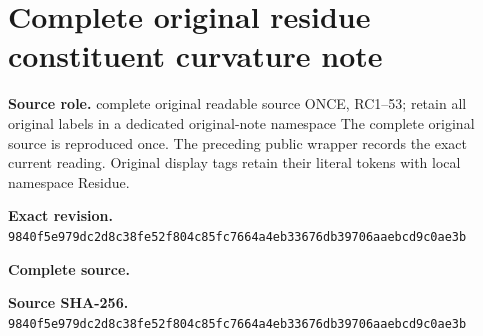 \begingroup
\sloppy
\small
\makeatletter
\let\EndpointOriginalTagForm\tagform@
\def\tagform@#1{\EndpointOriginalTagForm{Residue\, #1}}
\makeatother
\section{Complete original residue constituent curvature note}
\noindent\textbf{Source role.} complete original readable source ONCE, RC1–53; retain all original labels in a dedicated original-note namespace The complete original source is reproduced once. The preceding public wrapper records the exact current reading. Original display tags retain their literal tokens with local namespace Residue.\par
\noindent\textbf{Exact revision.} \nolinkurl{9840f5e979dc2d8c38fe52f804c85fc7664a4eb33676db39706aaebcd9c0ae3b}\par
\noindent\textbf{Complete source.} \par
\noindent\textbf{Source SHA-256.} \nolinkurl{9840f5e979dc2d8c38fe52f804c85fc7664a4eb33676db39706aaebcd9c0ae3b}\par\medskip

\endgroup
